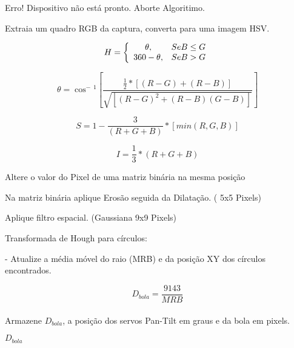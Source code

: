 \begin{algorithm}[!h!]


\caption{Algoritimo de rastreamento da bola laranja - Círculos de Hough.}\label{lst:algBall}


	{Erro! Dispositivo não está pronto.
	Aborte Algoritimo.
		}

{

Extraia um quadro RGB da captura, converta para uma imagem HSV.

\begin{equation}
     \centering
    	H = \left\{
		\begin{array}
		{ccl} 
		$$\theta, 	& Se B  \leq  G $$\\
		$$360 - \theta,	& Se B  >  G $$
		\end{array} 
\right.
\end{equation}

\begin{equation}
	\theta  =  \cos^-{^1} \left[  {   \frac {  \frac {1} {2} * [(R -G) + (R-B)]}  {  \sqrt{[(R -G)^2 + (R -B)(G -B)]}   }    }\right]
\end{equation}

\begin{equation}
	S  =  1 - { \frac {3} {(R+G+B)} } * [min (R,G,B)]
\end{equation}

\begin{equation}
	I  =  { \frac {1} {3}} * {(R+G+B)}
\end{equation}




	{Altere o valor do Pixel de uma matriz binária na mesma posição}

Na matriz binária aplique Erosão seguida da Dilatação. ( 5x5 Pixels)

Aplique filtro espacial. (Gaussiana 9x9 Pixels)

Transformada de Hough para círculos:

- Atualize a média móvel do raio (MRB) e da posição XY dos círculos encontrados.

\begin{equation} 
	D_{bola} = \frac {9143} {MRB}
\end{equation}\\

Armazene \(D_{bola}\), a posição dos servos Pan-Tilt em graus e da bola em pixels.
}

\Retorna \(D_{bola}\)




\end{algorithm}%


